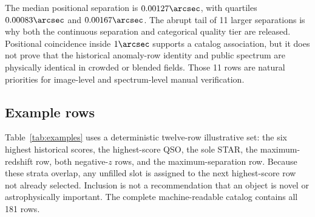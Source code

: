 \documentclass[twocolumn]{aastex701}
\begin{document}
The median positional separation is $0.00127\arcsec$, with quartiles $0.00083\arcsec$ and
$0.00167\arcsec$.  The abrupt tail of 11 larger separations is why both the continuous separation
and categorical quality tier are released.  Positional coincidence inside $1\arcsec$ supports a
catalog association, but it does not prove that the historical anomaly-row identity and public
spectrum are physically identical in crowded or blended fields.  Those 11 rows are natural
priorities for image-level and spectrum-level manual verification.

\subsection{Example rows}\label{sec:examples}

Table~\ref{tab:examples} uses a deterministic twelve-row illustrative set: the six highest
historical scores, the highest-score QSO, the sole STAR, the maximum-redshift row, both negative-$z$
rows, and the maximum-separation row.  Because these strata overlap, any unfilled slot is assigned
to the next highest-score row not already selected.  Inclusion is not a recommendation that an
object is novel or astrophysically important.  The complete machine-readable catalog contains all
181 rows.
\end{document}

